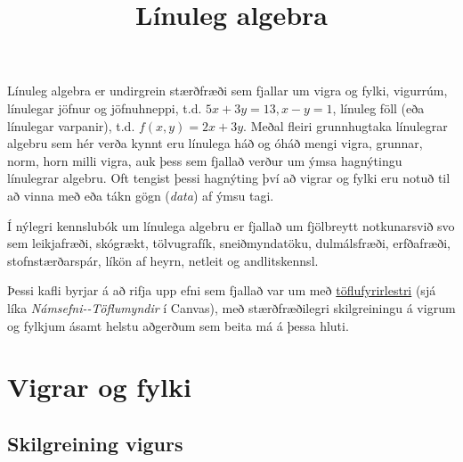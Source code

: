 \documentclass[a4paper]{article}
\begin{document}
\title{Línuleg algebra%
  \label{linuleg-algebra}}
\author{}
\date{}
\maketitle

Línuleg algebra er undirgrein stærðfræði sem fjallar um vigra og fylki, vigurrúm,
línulegar jöfnur og jöfnuhneppi, t.d. $5x + 3y = 13, x - y = 1$, línuleg
föll (eða línulegar varpanir), t.d. $f(x,y) = 2x + 3y$.
Meðal fleiri grunnhugtaka línulegrar algebru sem hér verða kynnt eru línulega
háð og óháð mengi vigra, grunnar, norm, horn milli vigra, auk þess sem fjallað verður um
ýmsa hagnýtingu línulegrar algebru. Oft tengist þessi hagnýting því að
vigrar og fylki eru notuð til að vinna með eða tákn gögn (\emph{data}) af ýmsu tagi.

Í nýlegri kennslubók um línulega algebru er fjallað um fjölbreytt
notkunarsvið svo sem leikjafræði, skógrækt, tölvugrafík, sneiðmyndatöku,
dulmálsfræði, erfðafræði, stofnstærðarspár, líkön af heyrn, netleit og andlitskennsl.

Þessi kafli byrjar á að rifja upp efni sem fjallað var um með \href{http://cs.hi.is/strei/linalg-1.pdf}{töflufyrirlestri} (sjá líka \emph{Námsefni-{}-Töflumyndir} í Canvas),
með stærðfræðilegri skilgreiningu á vigrum og fylkjum ásamt helstu aðgerðum sem
beita má á þessa hluti.


\section{Vigrar og fylki%
  \label{vigrar-og-fylki}%
}


\subsection{Skilgreining vigurs%
  \label{id1}%
  \label{skilgreining-vigurs}%
}
\end{document}
